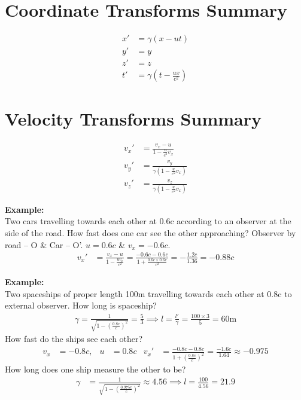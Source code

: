 \documentclass[a4paper, 11pt, normalem]{report}
\begin{document}
\section{Coordinate Transforms Summary}
\begin{align}
    x' &= \gamma(x - ut) \\
    y' &= y \\
    z' &= z \\
    t' &= \gamma(t - \frac{ux}{c^2})
\end{align}

\section{Velocity Transforms Summary}
\begin{align}
    v_{x}' &= \frac{v_{x} - u}{1 - \tfrac{u}{c^{2}}v_{x}} \\
    v_{y}' &= \frac{v_{y}}{\gamma(1 - \tfrac{u}{c^{2}}v_{x})} \\
    v_{z}' &= \frac{v_{z}}{\gamma(1 - \tfrac{u}{c^{2}}v_{x})}
\end{align}

\textbf{Example:}\\
Two cars travelling towards each other at 0.6c according to an observer at the side of the road.
How fast does one car see the other approaching?
Observer by road -- O \& Car -- O'.
$u = 0.6c$ \& $v_{x} = -0.6c$.
\begin{align}
    v_{x}' &= \frac{v_{x} - u}{1 - \tfrac{uv_{x}}{c^{2}}} = \frac{-0.6c - 0.6c}{1 + \tfrac{0.6c\times0.6c}{c^{2}}} = -\frac{1.2c}{1.36} = -0.88c
\end{align}

\textbf{Example:}\\
Two spaceships of proper length 100m travelling towards each other at 0.8c to external observer.
How long is spaceship?
\begin{align}
    \gamma = \frac{1}{\sqrt{1 - (\tfrac{0.8c}{c})^{2}}} = \frac{5}{3} \implies l = \frac{l'}{\gamma} = \frac{100\times3}{5} = 60\text{m}
\end{align}
How fast do the ships see each other?
\begin{align}
    v_{x} &= -0.8c, & u &= 0.8c & v_{x}' &= \frac{-0.8c - 0.8c}{1 + (\tfrac{0.8c}{c})^{2}} = \frac{-1.6c}{1.64} \approx -0.975
\end{align}
How long does one ship measure the other to be?
\begin{align}
    \gamma &= \frac{1}{\sqrt{1 - (\tfrac{0.975c}{c})^{2}}} \approx 4.56  \implies l = \frac{100}{4.56} = 21.9
\end{align}
\end{document}
